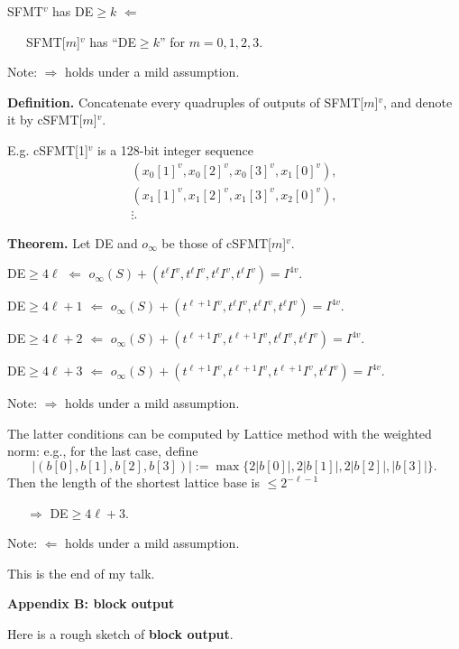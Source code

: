\documentclass[a4j,12pt,landscape]{jarticle}
\begin{document}
SFMT$^v$ has DE$ \geq k$ 
$\Leftarrow$

~~~SFMT[$m$]$^v$ has ``DE$ \geq k$''
for $m=0,1,2,3$.

Note: $\Rightarrow$ holds under a mild assumption.

\newpage
{\bf Definition.}
Concatenate every quadruples of outputs
of SFMT[$m$]$^v$, and denote it by cSFMT[$m$]$^v$.

E.g. cSFMT[1]$^v$ is a 128-bit integer sequence
$$
\begin{array}{c}
(x_0[1]^v, x_0[2]^v, x_0[3]^v, x_1[0]^v), \\
(x_1[1]^v, x_1[2]^v, x_1[3]^v, x_2[0]^v), \\
 \vdots.
\end{array}
$$

\newpage 
{\bf Theorem.} Let DE and $o_\infty$ be those of cSFMT[$m$]$^v$.

DE$\geq 4\ell$
$\Leftarrow$
$
o_\infty(S) + (t^\ell I^v,  t^\ell I^v,  t^\ell I^v, t^\ell I^v)
=I^{4v}.
$

DE$\geq 4\ell+1$
$\Leftarrow$
$
o_\infty(S) + (t^{\ell+1} I^v,  t^\ell I^v,  t^\ell I^v, t^\ell I^v)
=I^{4v}.
$

DE$\geq 4\ell+2$
$\Leftarrow$
$
o_\infty(S) + (t^{\ell+1} I^v,  t^{\ell+1} I^v,  t^\ell I^v, t^\ell I^v)
=I^{4v}.
$

DE$\geq 4\ell+3$
$\Leftarrow$
$
o_\infty(S) + (t^{\ell+1} I^v,  t^{\ell+1} I^v,  t^{\ell+1} I^v, t^\ell I^v)
=I^{4v}.
$

Note: $\Rightarrow$ holds under a mild assumption.

\newpage
The latter conditions can be computed by Lattice method
with the weighted norm: e.g., for the last case, define
$$
|(b[0], b[1], b[2], b[3])| := \max \{2|b[0]|, 2|b[1]|, 2|b[2]|, |b[3]|\}.
$$
Then the length of the shortest lattice base is $\leq 2^{-\ell-1}$

~~~$\Rightarrow$ DE$\geq 4\ell +3$. 

Note: $\Leftarrow$ holds under a mild assumption.

\vskip 1cm
\begin{center}
This is the end of my talk.
\end{center}

\newpage
{\bf Appendix B: block output}

Here is a rough sketch of {\bf block output}.
\end{document}
